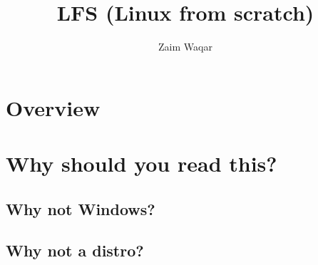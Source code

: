 \documentclass[11pt]{article}
\author{Zaim Waqar}
\date{}
\title{LFS (Linux from scratch)}
\begin{document}
\maketitle
\tableofcontents

\section{Overview}
\label{sec:org243c245}
\section{Why should you read this?}
\label{sec:orga2c7ce1}
\subsection{Why not Windows?}
\label{sec:org7fb317a}
\subsection{Why not a distro?}
\label{sec:org1002e8c}
\end{document}
